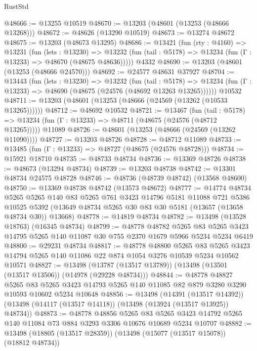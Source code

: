 \begin{lexlean}{RustStd}
\begin{coremodule}
@48666 := @13255 @10519
@48670 := @13203 (@48601 (@13253 (@48666 @13268)))
@48672 := @48626 (@13290 @10519)
@48673 := @13274 @48672
@48675 := @13203 (@48673 @13295)
@48686 := @13421
    (fun (rty : @4160) =>
    @13231
      (fun (lets : @13230) =>
      @13232 (fun (tail : @5178) => @13234 (fun (Γ : @13233) => @48670 (@48675 @48636)))))
    @4332
@48690 := @13203 (@48601 (@13253 (@48666 @24570)))
@48692 := @24577 @48631 @37927
@48704 := @13443
    (fun (lets : @13230) =>
    @13232
      (fun (tail : @5178) =>
      @13234 (fun (Γ : @13233) => @48690 (@48675 (@24576 (@48692 @13263 @13265))))))
    @10532
@48711 := @13203 (@48601 (@13253 (@48666 (@24569 (@13262 (@10533 @13265))))))
@48712 := @48692 @10532
@48721 := @13467
    (fun (tail : @5178) => @13234 (fun (Γ : @13233) => @48711 (@48675 (@24576 (@48712 @13265)))))
    @11089
@48726 := @48601 (@13253 (@48666 (@24569 (@13262 @11090))))
@48727 := @13203 @48726
@48728 := @48712 @11089
@48733 := @13485 (fun (Γ : @13233) => @48727 (@48675 (@24576 @48728)))
@48734 := @15921 @18710
@48735 := @48733 @48734
@48736 := @13369 @48726
@48738 := @48673 (@13294 @48734)
@48739 := @13203 @48738
@48742 := @13301 @48734 @24575 @48728
@48746 := @48736 (@48739 @48742) (@13568 @48600)
@48750 := @13369 @48738 @48742 (@13573 @48672)
@48777 := @14774
    @48734
    @5265
    @5265
    @140
    @83
    @5265
    @761
    @3423
    @14796
    @5181
    @11088
    @721
    @5386
    @10525
    @5392
    (@13649 @48734 @5265 @30 @83 @30 @5181 (@13657 (@13658 @48734 @30)) @13668)
@48778 := @14819 @48734
@48782 := @13498 (@13528 @18763) (@16345 @48734)
@48799 := @48778
    @48782
    @5265
    @83
    @5265
    @3423
    @14795
    @5265
    @140
    @11087
    @30
    @755
    @2370
    @1679
    @5966
    @5234
    @5234
    @6419
@48800 := @29231 @48734
@48817 := @48778
    @48800
    @5265
    @83
    @5265
    @3423
    @14794
    @5265
    @140
    @11086
    @22
    @874
    @1054
    @3276
    @10539
    @5234
    @10562
    @10571
@48827 := @13498 (@13787 (@13517 @13789)) (@13498 (@13501 (@13517 @13506)) (@14978 (@29228 @48734)))
@48844 := @48778
    @48827
    @5265
    @83
    @5265
    @3423
    @14793
    @5265
    @140
    @11085
    @82
    @879
    @3280
    @3290
    @10593
    @10602
    @5234
    @10648
@48856 := @13498
    (@14391 (@13517 @14392))
    (@13498 (@14117 (@13517 @14118)) (@13498 (@13924 (@13517 @13925)) @48734))
@48873 := @48778
    @48856
    @5265
    @83
    @5265
    @3423
    @14792
    @5265
    @140
    @11084
    @73
    @884
    @3293
    @3306
    @10676
    @10689
    @5234
    @10707
@48882 := @13498 (@18805 (@13517 @28359)) (@13498 (@15077 (@13517 @15078)) (@18812 @48734))

\end{coremodule}
\end{lexlean}
